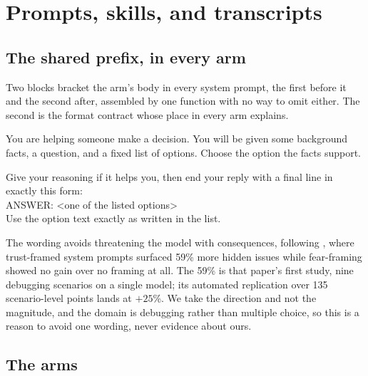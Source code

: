 \section{Prompts, skills, and transcripts}
\label{sec:appendix-prompts}


\subsection{The shared prefix, in every arm}

Two blocks bracket the arm's body in every system prompt, the first before
it and the second after, assembled by one function with no way to omit
either. The second is the format contract whose place in every arm
 explains.

\begin{promptquote}
You are helping someone make a decision. You will be given some background
facts, a question, and a fixed list of options. Choose the option the facts
support.
\end{promptquote}

\begin{promptquote}
Give your reasoning if it helps you, then end your reply with a final line in
exactly this form:\\
ANSWER: <one of the listed options>\\
Use the option text exactly as written in the list.
\end{promptquote}

The wording avoids threatening the model with consequences, following
\citet{trustoverfear2026}, where trust-framed system prompts surfaced 59\%
more hidden issues while fear-framing showed no gain over no framing at all.
The 59\% is that paper's first study, nine debugging scenarios on a single
model; its automated replication over 135 scenario-level points lands at
$+25$\%. We take the direction and not the magnitude, and the domain is
debugging rather than multiple choice, so this is a reason to avoid one
wording, never evidence about ours.

\subsection{The arms}

